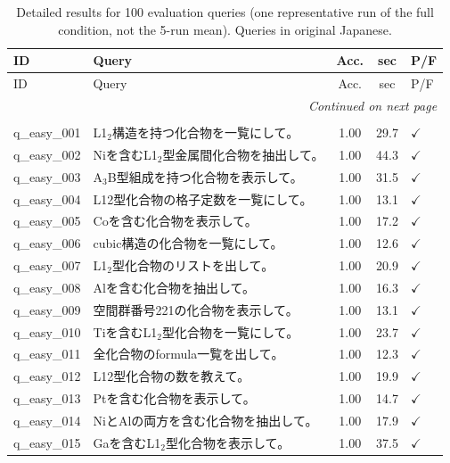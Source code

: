 \documentclass{npj-compt.mater}
\begin{document}
\begin{longtable}{lp{8.5cm}ccl}
  \caption{Detailed results for 100 evaluation queries (one representative run of the full condition, not the 5-run mean). Queries in original Japanese.}
  \label{tab:sup_query_detail} \\
  \toprule
  ID & Query & Acc. & sec & P/F \\
  \midrule
  \endfirsthead
  \toprule
  ID & Query & Acc. & sec & P/F \\
  \midrule
  \endhead
  \midrule
  \multicolumn{5}{r}{\textit{Continued on next page}} \\
  \endfoot
  \bottomrule
  \endlastfoot
    \midrule
    \multicolumn{5}{l}{\textbf{Easy ($n$=20)}} \\
    \midrule
    q\_easy\_001 & L1$_2$構造を持つ化合物を一覧にして。 & 1.00 & 29.7 & $\checkmark$ \\
    q\_easy\_002 & Niを含むL1$_2$型金属間化合物を抽出して。 & 1.00 & 44.3 & $\checkmark$ \\
    q\_easy\_003 & A$_3$B型組成を持つ化合物を表示して。 & 1.00 & 31.5 & $\checkmark$ \\
    q\_easy\_004 & L12型化合物の格子定数を一覧にして。 & 1.00 & 13.1 & $\checkmark$ \\
    q\_easy\_005 & Coを含む化合物を表示して。 & 1.00 & 17.2 & $\checkmark$ \\
    q\_easy\_006 & cubic構造の化合物を一覧にして。 & 1.00 & 12.6 & $\checkmark$ \\
    q\_easy\_007 & L1$_2$型化合物のリストを出して。 & 1.00 & 20.9 & $\checkmark$ \\
    q\_easy\_008 & Alを含む化合物を抽出して。 & 1.00 & 16.3 & $\checkmark$ \\
    q\_easy\_009 & 空間群番号221の化合物を表示して。 & 1.00 & 13.1 & $\checkmark$ \\
    q\_easy\_010 & Tiを含むL1$_2$型化合物を一覧にして。 & 1.00 & 23.7 & $\checkmark$ \\
    q\_easy\_011 & 全化合物のformula一覧を出して。 & 1.00 & 12.3 & $\checkmark$ \\
    q\_easy\_012 & L12型化合物の数を教えて。 & 1.00 & 19.9 & $\checkmark$ \\
    q\_easy\_013 & Ptを含む化合物を表示して。 & 1.00 & 14.7 & $\checkmark$ \\
    q\_easy\_014 & NiとAlの両方を含む化合物を抽出して。 & 1.00 & 17.9 & $\checkmark$ \\
    q\_easy\_015 & Gaを含むL1$_2$型化合物を表示して。 & 1.00 & 37.5 & $\checkmark$ \\

\end{longtable}
\end{document}
